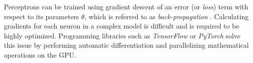 Perceptrons can be trained using gradient descent of an error (or \textit{loss}) term with respect to its parameters $\theta$, which is referred to as \textit{back-propagation} \cite{back-propagation}. Calculating gradients for each neuron in a complex model is difficult and is required to be highly optimized. Programming libraries such as \textit{TensorFlow} \cite{tensorflow} or \textit{PyTorch} \cite{pytorch} solve this issue by performing automatic differentiation and parallelizing mathematical operations on the GPU.

